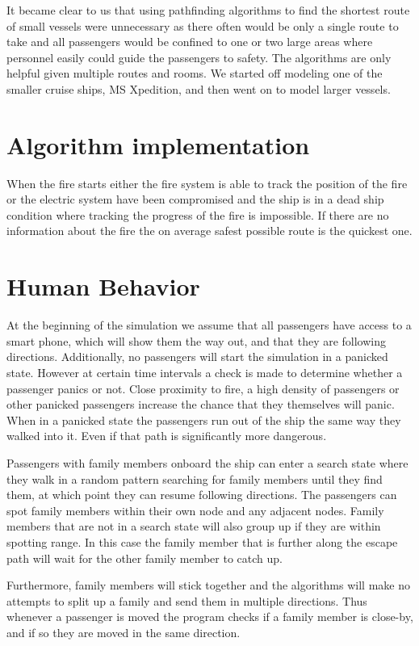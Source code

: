 It became clear to us that using pathfinding algorithms to find the shortest route of small vessels were unnecessary as  there often would be only a single route to take and all passengers would be confined to one or two large areas where personnel easily could guide the passengers to safety. The algorithms are only helpful given multiple routes and rooms. We started off modeling one of the smaller cruise ships, MS Xpedition, and then went on to model larger vessels.


\section{Algorithm implementation}

When the fire starts either the fire system is able to track the position of the fire or the electric system have been compromised and the ship is in a dead ship condition where tracking the progress of the fire is impossible. If there are no information about the fire the on average safest possible route is the quickest one. 

\section{Human Behavior}

At the beginning of the simulation we assume that all passengers have access to a smart phone, which will show them the way out, and that they are following directions. Additionally, no passengers will start the simulation in a panicked state. However at certain time intervals a check is made to determine whether a passenger panics or not. Close proximity to fire, a high density of passengers or other panicked passengers increase the chance that they themselves will panic. When in a panicked state the passengers run out of the ship the same way they walked into it. Even if that path is significantly more dangerous.

Passengers with family members onboard the ship can enter a search state where they walk in a random pattern searching for family members until they find them, at which point they can resume following directions. The passengers can spot family members within their own node and any adjacent nodes. Family members that are not in a search state will also group up if they are within spotting range. In this case the family member that is further along the escape path will wait for the other family member to catch up.

Furthermore, family members will stick together and the algorithms will make no attempts to split up a family and send them in multiple directions. Thus whenever a passenger is moved the program checks if a family member is close-by, and if so they are moved in the same direction.



